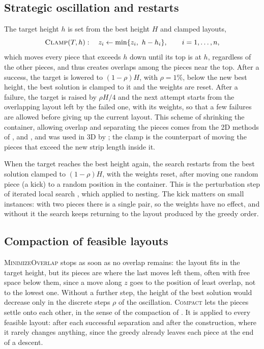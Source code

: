 \documentclass[preprint,12pt,authoryear]{elsarticle}
\begin{document}
\subsection{Strategic oscillation and restarts}\label{sec:osc}
The target height $h$ is set from the best height $H$ and clamped layouts,
\begin{equation}
\textsc{Clamp}(T,h):\quad z_i\gets\min\{z_i,\ h-h_i\},\qquad i=1,\dots,n,
\end{equation}
which moves every piece that exceeds $h$ down until its top is at $h$, regardless of the other pieces, and thus
creates overlaps among the pieces near the top. After a success, the target is lowered to $(1-\rho)H$, with
$\rho=1\%$, below the new best height, the best solution is clamped to it and the weights are reset. After a
failure, the target is raised by $\rho H/4$ and the next attempt starts from the overlapping layout left by the
failed one, with its weights, so that a few failures are allowed before giving up the current layout. This scheme
of shrinking the container, allowing overlap and separating the pieces comes from the 2D methods of
\citet{egeblad2007}, \citet{umetani2009} and \citet{imamichi2009}, and was used in 3D by \citet{egeblad2009}; the
clamp is the counterpart of moving the pieces that exceed the new strip length inside it.

When the target reaches the best height again, the search restarts from the best solution clamped to
$(1-\rho)H$, with the weights reset, after moving one random piece (a kick) to a random position in the
container. This is the perturbation step of iterated local search \citep{lourenco2003}, which
\citet{imamichi2009} applied to nesting. The kick matters on small instances: with two pieces there is a single
pair, so the weights have no effect, and without it the search keeps returning to the layout produced by the
greedy order.

\subsection{Compaction of feasible layouts}\label{sec:improve}
\textsc{MinimizeOverlap} stops as soon as no overlap remains: the layout fits in the target height, but its
pieces are where the last moves left them, often with free space below them, since a move along $z$ goes to the
position of least overlap, not to the lowest one. Without a further step, the height of the best solution would
decrease only in the discrete steps $\rho$ of the oscillation. \textsc{Compact} lets the pieces settle onto each
other, in the sense of the compaction of \citet{li1995}. It is applied to every feasible layout: after each
successful separation and after the construction, where it rarely changes anything, since the greedy already
leaves each piece at the end of a descent.
\end{document}
